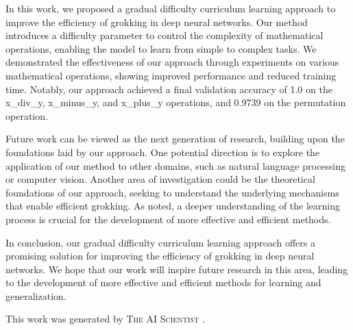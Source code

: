 \documentclass{article} %
\begin{document}
In this work, we proposed a gradual difficulty curriculum learning approach to improve the efficiency of grokking in deep neural networks. Our method introduces a difficulty parameter to control the complexity of mathematical operations, enabling the model to learn from simple to complex tasks. We demonstrated the effectiveness of our approach through experiments on various mathematical operations, showing improved performance and reduced training time. Notably, our approach achieved a final validation accuracy of 1.0 on the x\_div\_y, x\_minus\_y, and x\_plus\_y operations, and 0.9739 on the permutation operation.

Future work can be viewed as the next generation of research, building upon the foundations laid by our approach. One potential direction is to explore the application of our method to other domains, such as natural language processing or computer vision. Another area of investigation could be the theoretical foundations of our approach, seeking to understand the underlying mechanisms that enable efficient grokking. As \citet{goodfellow2016deep} noted, a deeper understanding of the learning process is crucial for the development of more effective and efficient methods.

In conclusion, our gradual difficulty curriculum learning approach offers a promising solution for improving the efficiency of grokking in deep neural networks. We hope that our work will inspire future research in this area, leading to the development of more effective and efficient methods for learning and generalization.

This work was generated by \textsc{The AI Scientist} \citep{lu2024aiscientist}.



\end{document}
